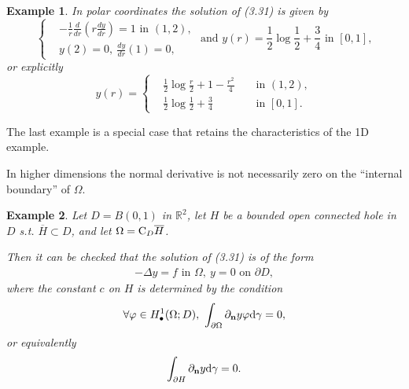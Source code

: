 \documentclass{book}
\numberwithin{equation}{section}
\newtheorem{example}{Example}[section]
\begin{document}
\begin{enumerate}
\begin{example}
        In polar coordinates the solution of (3.31) is given by
        \begin{equation*}
            \left\{\begin{split}
                &-\frac{1}{r}\frac{d}{dr}\left(r\frac{dy}{dr}\right) = 1 \mbox{ in } (1,2),\\
                &y(2) = 0,\ \frac{dy}{dr}(1) = 0,
            \end{split}\right. \mbox{ and } y(r) = \frac{1}{2}\log\frac{1}{2} + \frac{3}{4} \mbox{ in } [0,1],
        \end{equation*}
        or explicitly
        \begin{equation*}
            y(r) = \left\{\begin{split}
                &\frac{1}{2}\log\frac{r}{2} + 1 - \frac{r^2}{4} &&\mbox{ in } (1,2),\\
                &\frac{1}{2}\log\frac{1}{2} + \frac{3}{4} &&\mbox{ in } [0,1].
            \end{split}\right.
        \end{equation*}
    \end{example}
    The last example is a special case that retains the characteristics of the 1D example.
    
    In higher dimensions the normal derivative is not necessarily zero on the ``internal boundary'' of $\Omega$.
    
    \begin{example}
        Let $D = B(0,1)$ in $\mathbb{R}^2$, let $H$ be a bounded open connected hole in $D$ s.t. $\overline{H}\subset D$, and let $\Omega = {\rm C}_D\overline{H}$.
        
        Then it can be checked that the solution of (3.31) is of the form
        \begin{align*}
            -\Delta y = f \mbox{ in } \Omega,\ y = 0 \mbox{ on } \partial D,
        \end{align*}
        where the constant $c$ on $H$ is determined by the condition
        \begin{align*}
            \forall\varphi\in H_\bullet^1(\Omega;D),\ \int_{\partial\Omega} \partial_{\bf n}y\varphi{\rm d}\gamma = 0,
        \end{align*}
        or equivalently
        \begin{align*}
            \int_{\partial H} \partial_{\bf n}y{\rm d}\gamma = 0.
        \end{align*}
    \end{example}
    

\end{enumerate}
\end{document}
